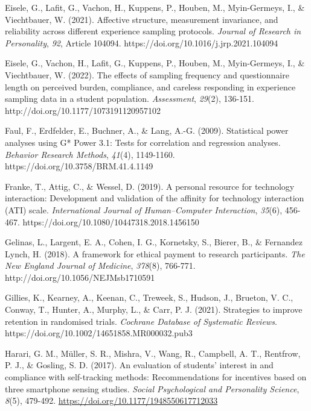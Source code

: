 \documentclass[authordate, empirical]{jote-new-article}
\begin{document}
	Eisele, G., Lafit, G., Vachon, H., Kuppens, P., Houben, M., Myin-Germeys, I., \& Viechtbauer, W. (2021). Affective structure, measurement invariance, and reliability across different experience sampling protocols. \emph{Journal of Research in Personality},\emph{ 92}, Article 104094. https://doi.org/10.1016/j.jrp.2021.104094



	Eisele, G., Vachon, H., Lafit, G., Kuppens, P., Houben, M., Myin-Germeys, I., \& Viechtbauer, W. (2022). The effects of sampling frequency and questionnaire length on perceived burden, compliance, and careless responding in experience sampling data in a student population. \emph{Assessment},\emph{ 29}(2), 136-151. http://doi.org/10.1177/1073191120957102



	Faul, F., Erdfelder, E., Buchner, A., \& Lang, A.-G. (2009). Statistical power analyses using G* Power 3.1: Tests for correlation and regression analyses. \emph{Behavior Research Methods},\emph{ 41}(4), 1149-1160. https://doi.org/10.3758/BRM.41.4.1149



	Franke, T., Attig, C., \& Wessel, D. (2019). A personal resource for technology interaction: Development and validation of the affinity for technology interaction (ATI) scale. \emph{International Journal of Human--Computer Interaction},\emph{ 35}(6), 456-467. https://doi.org/10.1080/10447318.2018.1456150



	Gelinas, L., Largent, E. A., Cohen, I. G., Kornetsky, S., Bierer, B., \& Fernandez Lynch, H. (2018). A framework for ethical payment to research participants. \emph{The New England Journal of Medicine},\emph{ 378}(8), 766-771. http://doi.org/10.1056/NEJMsb1710591



	Gillies, K., Kearney, A., Keenan, C., Treweek, S., Hudson, J., Brueton, V. C., Conway, T., Hunter, A., Murphy, L., \& Carr, P. J. (2021). Strategies to improve retention in randomised trials. \emph{Cochrane Database of Systematic Reviews}. https://doi.org/10.1002/14651858.MR000032.pub3



	Harari, G. M., Müller, S. R., Mishra, V., Wang, R., Campbell, A. T., Rentfrow, P. J., \& Gosling, S. D. (2017). An evaluation of students' interest in and compliance with self-tracking methods: Recommendations for incentives based on three smartphone sensing studies. \emph{Social Psychological and Personality Science},\emph{ 8}(5), 479-492. \href{https://doi.org/10.1177/1948550617712033}{https://doi.org/10.1177/1948550617712033}
\end{document}
